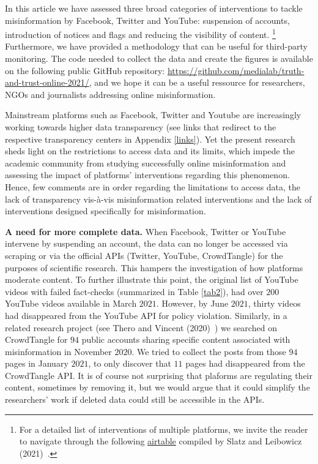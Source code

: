\documentclass{article}
\begin{document}
In this article we have assessed three broad categories of interventions to tackle misinformation by Facebook, Twitter and YouTube: suspension of accounts, introduction of notices and flags and reducing the visibility of content.
\footnote{For a detailed list of interventions of multiple platforms, we invite the reader to navigate through the following \href{https://airtable.com/shrO0ooI9WSEfIUhb/tblAWQwFOiihKdQjm/viwZLAOzLK1NQ0c2n?blocks=hide}{airtable} compiled by Slatz and Leibowicz (2021)~\cite{niemanlab}.}
Furthermore, we have provided a methodology that can be useful for third-party monitoring. 
The code needed to collect the data and create the figures is available on the following public GitHub repository: \href{https://github.com/medialab/truth-and-trust-online-2021/}{https://github.com/medialab/truth-and-trust-online-2021/}, and we hope it can be a useful ressource for researchers, NGOs and journalists addressing online misinformation. 

\smallskip

Mainstream platforms such as Facebook, Twitter and Youtube are increasingly working towards higher data transparency (see links that redirect to the respective transparency centers in Appendix \ref{links}). 
Yet the present research sheds light on the restrictions to access data and its limits, which impede the academic community from studying successfully online misinformation and assessing the impact of platforms' interventions regarding this phenomenon. 
Hence, few comments are in order regarding the limitations to access data, the lack of transparency vis-\`{a}-vis misinformation related interventions and the lack of interventions designed specifically for misinformation. 

\smallskip

{\bf A need for more complete data.} 
When Facebook, Twitter or YouTube intervene by suspending an account, the data can no longer be accessed via scraping or via the official APIs (Twitter, YouTube, CrowdTangle) for the purposes of scientific research. 
This hampers the investigation of how platforms moderate content. 
To further illustrate this point, the original list of YouTube videos with failed fact-checks (summarized in Table \ref{tab2}), had over $200$ YouTube videos available in March $2021$. 
However, by June $2021$, thirty videos had disappeared from the YouTube API for policy violation. 
Similarly, in a related research project (see Thero and Vincent (2020)~\cite{therovincent}) we searched on CrowdTangle for $94$ public accounts sharing specific content associated with misinformation in November $2020$. 
We tried to collect the posts from those $94$ pages in January $2021$, to only discover that $11$ pages had disappeared from the CrowdTangle API.
It is of course not surprising that plaforms are regulating their content, sometimes by removing it, but we would argue that it could simplify the researchers' work if deleted data could still be accessible in the APIs.
\end{document}
